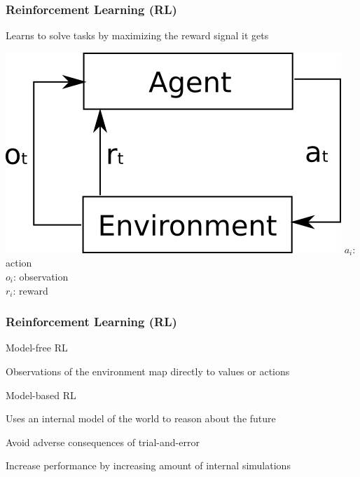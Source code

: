 \begin{frame}
    \frametitle{Reinforcement Learning (RL)}

Learns to solve tasks by maximizing the reward signal it gets
\vspace{10mm}

\begin{multicols}{2}
	\includegraphics[width=0.9\columnwidth]{./Images/rl_agent.png}%
    \vfill\columnbreak	
	$a_i$: action\\
	$o_i$: observation\\
	$r_i$: reward
\end{multicols}

\end{frame}
\clearpage

\begin{frame}
    \frametitle{Reinforcement Learning (RL)}

Model-free RL
\begin{PraesentationAufzaehlung}
	\item Observations of the environment map directly to values or actions	
\end{PraesentationAufzaehlung}
\vspace{-10mm}
Model-based RL
\begin{PraesentationAufzaehlung}
	\item Uses an internal model of the world to reason about the future
	\item Avoid adverse consequences of trial-and-error
	\item Increase performance by increasing amount of internal simulations
\end{PraesentationAufzaehlung}

\end{frame}
\clearpage


